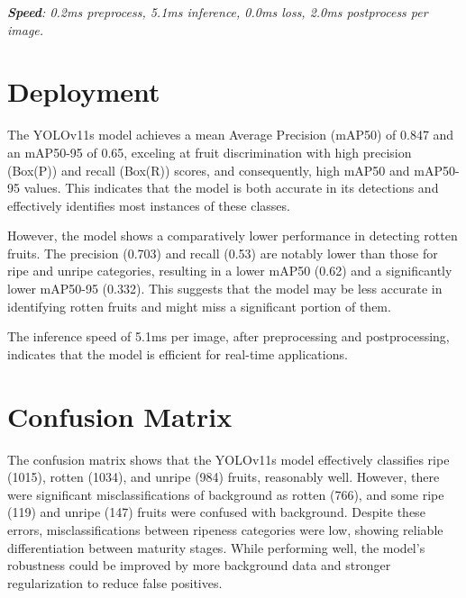 {\begin{table}[!htpb]
    \vspace{0.5em}
    \textit{\textbf{Speed}: 0.2ms preprocess, 5.1ms inference, 0.0ms loss, 2.0ms postprocess per image.}
\end{table}


\section{Deployment}
The YOLOv11s model achieves a mean Average Precision (mAP50) of 0.847 and an mAP50-95 of 0.65, exceling at fruit discrimination with high precision (Box(P)) and recall (Box(R)) scores, and consequently, high mAP50 and mAP50-95 values. This indicates that the model is both accurate in its detections and effectively identifies most instances of these classes.
\vspace{\myvspace}

However, the model shows a comparatively lower performance in detecting rotten fruits. The precision (0.703) and recall (0.53) are notably lower than those for ripe and unripe categories, resulting in a lower mAP50 (0.62) and a significantly lower mAP50-95 (0.332). This suggests that the model may be less accurate in identifying rotten fruits and might miss a significant portion of them.
\vspace{\myvspace}

The inference speed of 5.1ms per image, after preprocessing and postprocessing, indicates that the model is efficient for real-time applications.

\section{Confusion Matrix}
The confusion matrix shows that the  YOLOv11s model effectively classifies ripe (1015), rotten (1034), and unripe (984) fruits, reasonably well. However, there were significant misclassifications of background as rotten (766), and some ripe (119) and unripe (147) fruits were confused with background. Despite these errors, misclassifications between ripeness categories were low, showing reliable differentiation between maturity stages. While performing well, the model's robustness could be improved by more background data and stronger regularization to reduce false positives.

}
